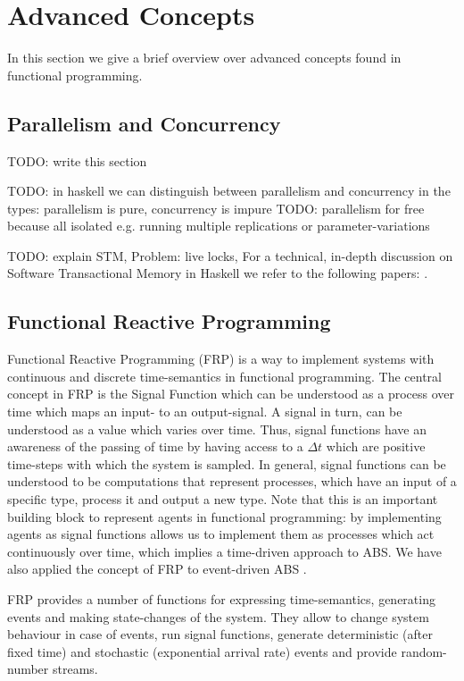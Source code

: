 \section{Advanced Concepts}
In this section we give a brief overview over advanced concepts found in functional programming. 

\subsection{Parallelism and Concurrency}
TODO: write this section

TODO: in haskell we can distinguish between parallelism and concurrency in the types: parallelism is pure, concurrency is impure
TODO: parallelism for free because all isolated e.g. running multiple replications or parameter-variations

TODO: explain STM, Problem: live locks, For a technical, in-depth discussion on Software Transactional Memory in Haskell we refer to the following papers: \citep{harris_composable_2005, osullivan_real_2008}.

\subsection{Functional Reactive Programming}
\label{sec:frp}
Functional Reactive Programming (FRP) is a way to implement systems with continuous and discrete time-semantics in functional programming. The central concept in FRP is the Signal Function which can be understood as a process over time which maps an input- to an output-signal. A signal in turn, can be understood as a value
which varies over time. Thus, signal functions have an awareness of the passing of time by having access to a $\Delta t$ which are positive time-steps with which the system is sampled. In general, signal functions can be understood to be computations that represent processes, which have an input of a specific type, process it and output a new type. Note that this is an important building block to represent agents in functional programming: by implementing agents as signal functions allows us to implement them as processes which act continuously over time, which implies a time-driven approach to ABS. We have also applied the concept of FRP to event-driven ABS \citep{meyer_event-driven_2014}.

FRP provides a number of functions for expressing time-semantics, generating events and making state-changes of the system. They allow to change system behaviour in case of events, run signal functions, generate deterministic (after fixed time) and stochastic (exponential arrival rate) events and provide random-number streams. 

